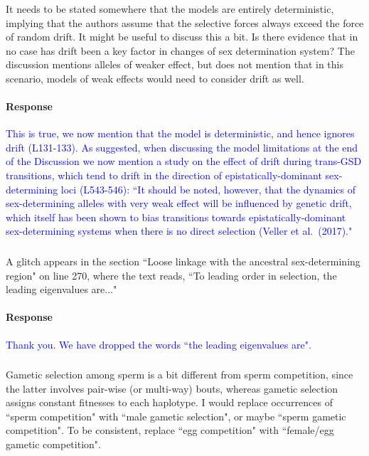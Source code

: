 \documentclass[10pt,letterpaper]{article}
\begin{document}
\noindent\subsubsection{}
It needs to be stated somewhere that the models are entirely deterministic, implying that the authors assume that the selective forces always exceed the force of random drift. It might be useful to discuss this a bit. Is there evidence that in no case has drift been a key factor in changes of sex determination system?  The discussion mentions alleles of weaker effect, but does not mention that in this scenario, models of weak effects would need to consider drift as well.

\noindent\paragraph{Response}
\textcolor{blue}{
This is true, we now mention that the model is deterministic, and hence ignores drift (L131-133). 
As suggested, when discussing the model limitations at the end of the Discussion we now mention a study on the effect of drift during trans-GSD transitions, which tend to drift in the direction of epistatically-dominant sex-determining loci (L543-546): ``It should be noted, however, that the dynamics of sex-determining alleles with very weak effect will be influenced by genetic drift, which itself has been shown to bias transitions towards epistatically-dominant sex-determining systems when there is no direct selection (Veller et al.\ (2017)."}

\noindent\subsubsection{}
A glitch appears in the section ``Loose linkage with the ancestral sex-determining region" on line 270, where the text reads, ``To leading order in selection, the leading eigenvalues are..."

\noindent\paragraph{Response}
\textcolor{blue}{Thank you. We have dropped the words ``the leading eigenvalues are".}

\noindent\subsubsection{}
Gametic selection among sperm is a bit different from sperm competition, since the latter involves pair-wise (or multi-way) bouts, whereas gametic selection assigns constant fitnesses to each haplotype. I would replace occurrences of ``sperm competition" with ``male gametic selection", or maybe ``sperm gametic competition". To be consistent, replace ``egg competition" with ``female/egg gametic competition". 
\end{document}
